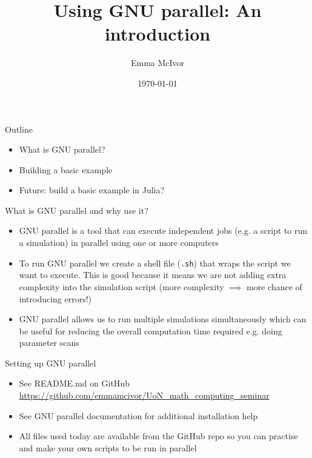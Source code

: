 \documentclass{beamer}
\title[GNU Parallel]{Using GNU parallel: An introduction}
\author[Emma McIvor]{Emma McIvor}
\institute{University of Nottingham}
\date{\today}
\begin{document}
\begin{frame}
  \titlepage
\end{frame}


\begin{frame}{Outline}
\begin{itemize}
\item What is GNU parallel?
\item Building a basic example
\item Future: build a basic example in Julia?
\end{itemize}
\end{frame}

\begin{frame}{What is GNU parallel and why use it?}
\begin{itemize}
	\item GNU parallel is a tool that can execute independent jobs (e.g. a script to run a simulation) in parallel using one or more computers
	\item To run GNU parallel we create a shell file (\texttt{.sh}) that wraps the script we want to execute. This is good because it means we are not adding extra complexity into the simulation script (more complexity $\implies$ more chance of introducing errors!)
	\item GNU parallel allows us to run multiple simulations simultaneously which can be useful for reducing the overall computation time required e.g. doing parameter scans
\end{itemize}
\end{frame}

\begin{frame}{Setting up GNU parallel}
\begin{itemize}
\item See README.md on GitHub \url{https://github.com/emmamcivor/UoN_math_computing_seminar}
\item See GNU parallel documentation for additional installation help
\item All files used today are available from the GitHub repo so you can practise and make your own scripts to be run in parallel
\end{itemize}
\end{frame}
\end{document}
